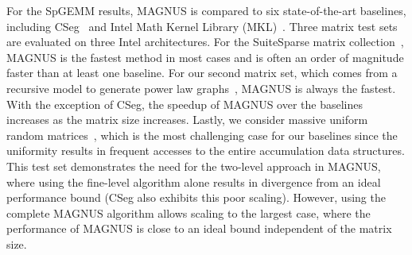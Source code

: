For the SpGEMM results, MAGNUS is compared to six state-of-the-art baselines, including
CSeg~\cite{cseg} and Intel Math Kernel Library (MKL)~\cite{mkl}.
Three matrix test sets are evaluated on three Intel architectures.
For the SuiteSparse matrix collection~\cite{suitesparse}, MAGNUS is the fastest method in most cases and is often an order of magnitude faster than at least one baseline.
For our second matrix set, which comes from a recursive model to generate power law graphs~\cite{rmat}, MAGNUS is always the fastest.
With the exception of CSeg, the speedup of MAGNUS over the baselines increases as the matrix size increases.
Lastly, we consider massive uniform random matrices~\cite{erdosrenyi}, which is the most challenging case for our baselines since the uniformity results in frequent accesses to the entire accumulation data structures.
This test set demonstrates the need for the two-level approach in MAGNUS, where using the fine-level algorithm alone results in divergence from an ideal performance bound (CSeg also exhibits this poor scaling).
However, using the complete MAGNUS algorithm allows scaling to the largest case, where the performance of MAGNUS is close to an ideal bound independent of the matrix size.